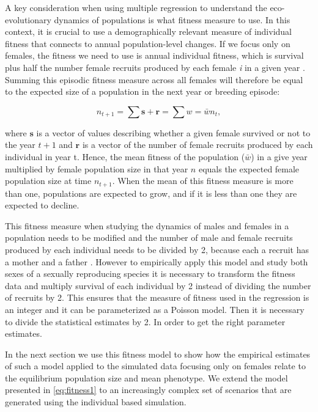 \documentclass{article}
\begin{document}
A key consideration when using multiple regression to understand the eco-evolutionary dynamics of populations is what fitness measure to use. In this context, it is crucial to use a demographically relevant measure of individual fitness that connects to annual population-level changes. If we focus only on females, the fitness we need to use is annual individual fitness, which is survival plus half the number female recruits produced by each female \textit{i} in a given year \citep{Saether2015}. Summing this episodic fitness measure across all females will therefore be equal to the expected size of a population in the next year or breeding episode: 

\begin{equation} \label{eq:fitness measure}
n_{t+1}=\sum \bm{s} + \bm{r}= \sum w=\bar{w}n_{t}, 
\end{equation}

\noindent where  $\bm{s}$ is a vector of values describing whether a given female survived or not to the year $t+1$ and $\bm{r}$ is a vector of the number of female recruits produced by each individual in year t. Hence, the mean fitness of the population ($\bar{w}$) in a give year multiplied by female population size in that year $n$ equals the expected female population size at time $n_{t + 1}$. When the mean of this fitness measure is more than one, populations are expected to grow, and if it is less than one they are expected to decline.

This fitness measure when studying the dynamics of males and females in a population needs to be modified and the number of male and female recruits produced by each individual needs to be divided by 2, because each a recruit has a mother and a father \citep{Saether2015}. However to empirically apply this model and study both sexes of a sexually reproducing species it is necessary to transform the fitness data and multiply survival of each individual by 2 instead of dividing the number of recruits by 2. This ensures that the measure of fitness used in the regression is an integer and it can be parameterized as a Poisson model. Then it is necessary to divide the statistical estimates by 2. In order to get the right parameter estimates.

In the next section we use this fitness model to show how the empirical estimates of such a model applied to the simulated data focusing only on females relate to the equilibrium population size and mean phenotype. We extend the model presented in \ref{eq:fitness1} to an increasingly complex set of scenarios that are generated using the individual based simulation.
\end{document}
